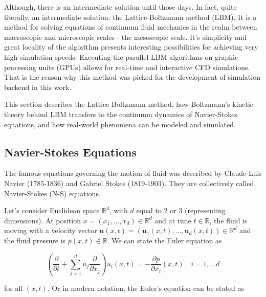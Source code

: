 Although, there is an intermediate solution until those days. In fact, quite literally, an intermediate solution: the Lattice-Boltzmann method (LBM). It is a method for solving equations of continuum fluid mechanics in the realm between macroscopic and microscopic scales - the mesoscopic scale. It's simplicity and great locality of the algorithm presents interesting possibilities for achieving very high simulation speeds. Executing the parallel LBM algorithms on graphic processing units (GPUs) allows for real-time and interactive CFD simulations. That is the reason why this method was picked for the development of simulation backend in this work.

This section describes the Lattice-Boltzmann method, how Boltzmann's kinetic theory behind LBM transfers to the continuum dynamics of Navier-Stokes equations, and how real-world phenomena can be modeled and simulated.




\subsection{Navier-Stokes Equations}
The famous equations governing the motion of fluid was described by Claude-Luis Navier (1785-1836) and Gabriel Stokes (1819-1903). They are collectively called Navier-Stokes (N-S) equations.

Let's consider Euclidean space $\mathbb{R}^d$, with $d$ equal to 2 or 3 (representing dimensions). At position $x = (x_1,...,x_d) \in \mathbb{R}^d$ and at time $t \in \mathbb{R}$, the fluid is moving with a velocity vector $\bm{u}(x,t) = (\bm{u}_1(x,t),...,\bm{u}_d(x,t)) \in \mathbb{R}^d$ and the fluid pressure is $p(x,t) \in \mathbb{R}$. We can state the Euler equation as


\begin{equation} 
	\label{eqn:ee}
	\left(\frac{\partial}{\partial t} + \sum_{j=1}^{d} u_j \frac{\partial}{\partial x_j}\right) u_i(x,t) = - \frac{\partial p}{\partial x_i} (x,t) \quad  i = 1,...d
\end{equation}

for all $(x, t)$. Or in modern notation, the Euler's equation can be stated as

